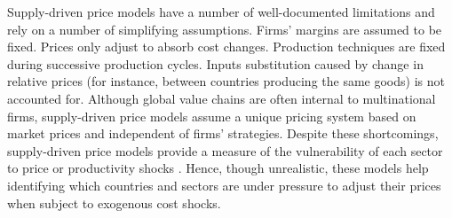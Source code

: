\documentclass[11pt,a4paper]{paper} %
\begin{document}
Supply-driven price models have a number of well-documented limitations \citep{Folloni1994} and rely on a number of simplifying assumptions.
Firms' margins are assumed to be fixed.
Prices only adjust to absorb cost changes.
Production techniques are fixed during successive production cycles.
Inputs substitution caused by change in relative prices (for instance, between countries producing the same goods) is not accounted for.
Although global value chains are often internal to multinational firms, supply-driven price models assume a unique pricing system based on market prices and independent of firms' strategies. 
Despite these shortcomings, supply-driven price models provide a measure of the vulnerability of each sector to price or productivity shocks \citep{Acemoglu2012,Carvalho2014}. 
Hence, though unrealistic, these models help identifying which countries and sectors are under pressure to adjust their prices when subject to exogenous cost shocks. 
\end{document}
